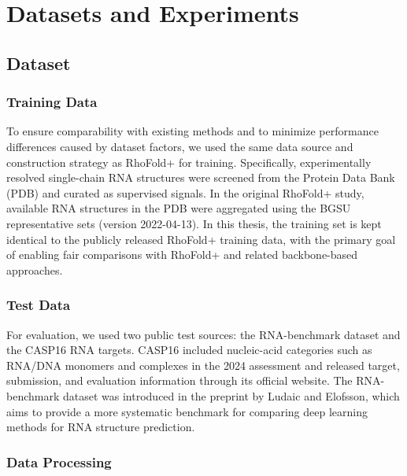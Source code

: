 \chapter{Datasets and Experiments}

\section{Dataset}
\subsection{Training Data}

To ensure comparability with existing methods and to minimize performance differences caused by dataset factors, we used the same data source and construction strategy as RhoFold+ for training\cite{Shen2024RhoFoldPlus}. Specifically, experimentally resolved single-chain RNA structures were screened from the Protein Data Bank (PDB) and curated as supervised signals. In the original RhoFold+ study, available RNA structures in the PDB were aggregated using the BGSU representative sets (version 2022-04-13). In this thesis, the training set is kept identical to the publicly released RhoFold+ training data, with the primary goal of enabling fair comparisons with RhoFold+ and related backbone-based approaches.

\subsection{Test Data}

For evaluation, we used two public test sources: the RNA-benchmark dataset and the CASP16 RNA targets. CASP16 included nucleic-acid categories such as RNA/DNA monomers and complexes in the 2024 assessment and released target, submission, and evaluation information through its official website. The RNA-benchmark dataset was introduced in the preprint by Ludaic and Elofsson, which aims to provide a more systematic benchmark for comparing deep learning methods for RNA structure prediction\cite{Ludaic2025limits}.

\subsection{Data Processing}

